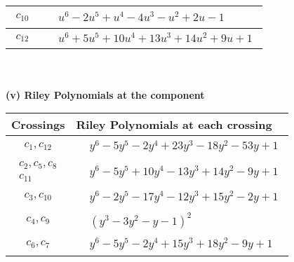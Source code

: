 \documentclass[1p]{elsarticle_modified}
\theoremstyle{definition}
\begin{document}
\begin{tabular}{m{50pt}|m{274pt}}
\hline $$\begin{aligned}c_{10}\end{aligned}$$&$\begin{aligned}
&u^6-2 u^5+u^4-4 u^3- u^2+2 u-1
\end{aligned}$\\
\hline $$\begin{aligned}c_{12}\end{aligned}$$&$\begin{aligned}
&u^6+5 u^5+10 u^4+13 u^3+14 u^2+9 u+1
\end{aligned}$\\
\hline
\end{tabular}\\~\\
\newpage\renewcommand{\arraystretch}{1}
\flushleft \textbf{(v) Riley Polynomials at the component}\newline \\
\begin{tabular}{m{50pt}|m{274pt}}
Crossings & \hspace{64pt}Riley Polynomials at each crossing \\
\hline $$\begin{aligned}c_{1},c_{12}\end{aligned}$$&$\begin{aligned}
&y^6-5 y^5-2 y^4+23 y^3-18 y^2-53 y+1
\end{aligned}$\\
\hline $$\begin{aligned}c_{2},c_{5},c_{8}\\c_{11}\end{aligned}$$&$\begin{aligned}
&y^6-5 y^5+10 y^4-13 y^3+14 y^2-9 y+1
\end{aligned}$\\
\hline $$\begin{aligned}c_{3},c_{10}\end{aligned}$$&$\begin{aligned}
&y^6-2 y^5-17 y^4-12 y^3+15 y^2-2 y+1
\end{aligned}$\\
\hline $$\begin{aligned}c_{4},c_{9}\end{aligned}$$&$\begin{aligned}
&(y^3-3 y^2- y-1)^2
\end{aligned}$\\
\hline $$\begin{aligned}c_{6},c_{7}\end{aligned}$$&$\begin{aligned}
&y^6-5 y^5-2 y^4+15 y^3+18 y^2-9 y+1
\end{aligned}$\\
\hline
\end{tabular}\\~\\
\end{document}
